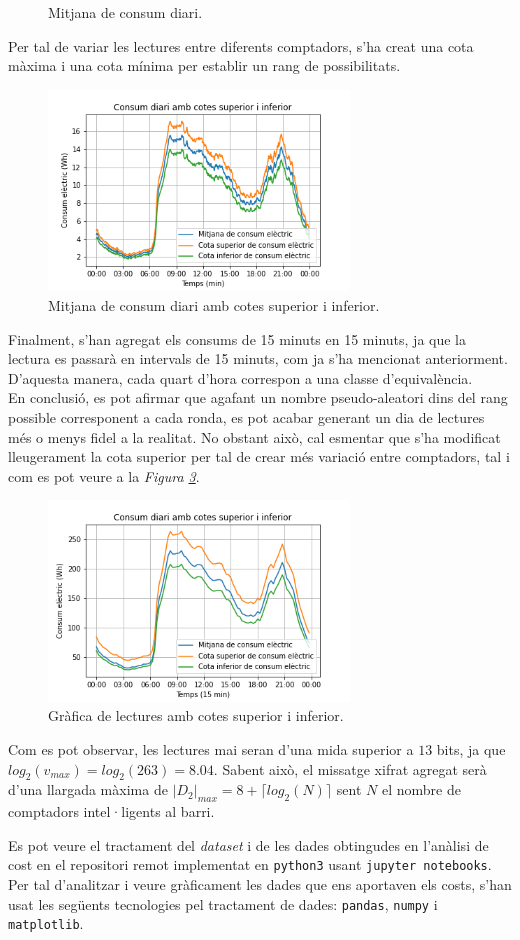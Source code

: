 \begin{itemize}
\begin{figure}[H]
	\caption{Mitjana de consum diari.}
	\label{fig:consumptionmin1}
\end{figure}
Per tal de variar les lectures entre diferents comptadors, s'ha creat una cota màxima i una cota mínima per establir un rang de possibilitats.
\begin{figure}[H]
	\centering
	\includegraphics[width=8cm]{imgs/cost/consumptionmin2.png}
	\caption{Mitjana de consum diari amb cotes superior i inferior.}
	\label{fig:consumptionmin2}
\end{figure}
Finalment,  s'han agregat els consums de 15 minuts en 15 minuts, ja que la lectura es passarà en intervals de 15 minuts, com ja s'ha mencionat anteriorment. D'aquesta manera, cada quart d'hora correspon a una classe d'equivalència. \\
En conclusió, es pot afirmar que agafant un nombre pseudo-aleatori dins del rang possible corresponent a cada ronda, es pot acabar generant un dia de lectures més o menys fidel a la realitat. No obstant això, cal esmentar que s'ha modificat lleugerament la cota superior per tal de crear més variació entre comptadors, tal i com es pot veure a la \textit{Figura \ref{fig:consumption2}}.
\begin{figure}[H]
	\centering
	\includegraphics[width=8cm]{imgs/cost/consumption2.png}
	\caption{Gràfica de lectures amb cotes superior i inferior.}
	\label{fig:consumption2}
\end{figure}
Com es pot observar, les lectures mai seran d'una mida superior a $13$ bits, ja que $log_2(v_{max}) = log_2(263) = 8.04$. Sabent això, el missatge xifrat agregat serà d'una llargada màxima de $|D_2|_{max} = 8 + \lceil log_2(N) \rceil$ sent $N$ el nombre de comptadors intel·ligents al barri.
\end{itemize}
Es pot veure el tractament del \textit{dataset} i de les dades obtingudes en l'anàlisi de cost en el repositori remot \cite{lab-recsi} implementat en \texttt{python3} usant \texttt{jupyter notebooks}. Per tal d'analitzar i veure gràficament les dades que ens aportaven els costs, s'han usat les següents tecnologies pel tractament de dades: \texttt{pandas}, \texttt{numpy} i \texttt{matplotlib}.
